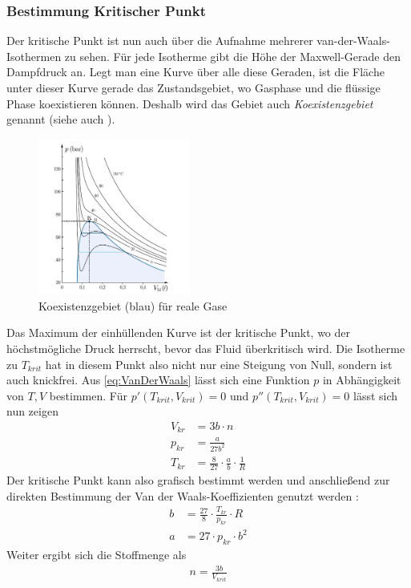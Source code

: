 \documentclass{subfiles}
\begin{document}
\subsubsection{Bestimmung Kritischer Punkt}
	Der kritische Punkt ist nun auch über die Aufnahme mehrerer van-der-Waals-Isothermen zu sehen. Für jede Isotherme gibt die Höhe der Maxwell-Gerade den Dampfdruck an. Legt man eine Kurve über alle diese Geraden, ist die Fläche unter dieser Kurve gerade das Zustandsgebiet, wo Gasphase und die flüssige Phase koexistieren können. Deshalb wird das Gebiet auch \textit{Koexistenzgebiet} genannt (siehe auch ). 
	
	\begin{figure}
		\centering
		\includegraphics[width=5cm]{Bilddateien/Grundlagen/koexistenzgebiet.jpg}
		\caption{Koexistenzgebiet (blau) für reale Gase \cite[p.159]{heintze}}
	\end{figure}		
	Das Maximum der einhüllenden Kurve ist der kritische Punkt, wo der höchstmögliche Druck herrscht, bevor das Fluid überkritisch wird. Die Isotherme zu $T_{krit}$ hat in diesem Punkt also nicht nur eine Steigung von Null, sondern ist auch knickfrei. Aus \eqref{eq:VanDerWaals} lässt sich eine Funktion $p$ in Abhängigkeit von $T,V$ bestimmen. Für $p'(T_{krit},V_{krit})=0$ und $p''(T_{krit},V_{krit})=0$ lässt sich nun zeigen
	\begin{align*}
		V_{kr}&=3b\cdot n\\
		p_{kr}&=\frac{a}{27b^2}\\
		T_{kr}&=\frac{8}{27}\cdot\frac{a}{b}\cdot\frac{1}{R}
	\end{align*}
	Der kritische Punkt kann also grafisch bestimmt werden und anschließend zur direkten Bestimmung der Van der Waals-Koeffizienten genutzt werden \cite[p.158-159]{heintze}:
	\begin{align*}
		b&=\frac{27}{8}\cdot\frac{T_{kr}}{p_{kr}}\cdot R\\
		a&=27\cdot p_{kr}\cdot b^2
	\end{align*}
	Weiter ergibt sich die Stoffmenge als
	\begin{align*}
		n=\frac{3b}{V_{krit}}
	\end{align*}
\end{document}
